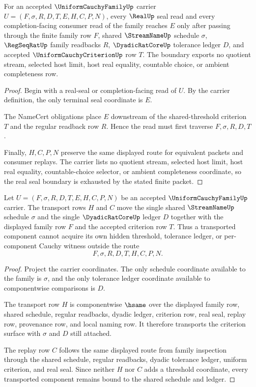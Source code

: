 \begin{theorem}
\label{thm:uniform-cauchy-family-real-seal-boundary}
For an accepted $\UniformCauchyFamilyUp$ carrier $U=(F,\sigma,R,D,T,E,H,C,P,N)$, every $\RealUp$ seal read and every completion-facing consumer read of the family reaches $E$ only after passing through the finite family row $F$, shared $\StreamNameUp$ schedule $\sigma$, $\RegSeqRatUp$ family readbacks $R$, $\DyadicRatCoreUp$ tolerance ledger $D$, and accepted $\UniformCauchyCriterionUp$ row $T$. The boundary exports no quotient stream, selected host limit, host real equality, countable choice, or ambient completeness row.
\end{theorem}
\begin{proof}
Begin with a real-seal or completion-facing read of $U$. By the carrier definition, the only terminal seal coordinate is $E$.

The NameCert obligations place $E$ downstream of the shared-threshold criterion $T$ and the regular readback row $R$. Hence the read must first traverse $F,\sigma,R,D,T$.

Finally, $H,C,P,N$ preserve the same displayed route for equivalent packets and consumer replays. The carrier lists no quotient stream, selected host limit, host real equality, countable-choice selector, or ambient completeness coordinate, so the real seal boundary is exhausted by the stated finite packet.
\end{proof}

\begin{theorem}
\label{thm:uniform-cauchy-family-shared-threshold-transport}
Let $U=(F,\sigma,R,D,T,E,H,C,P,N)$ be an accepted $\UniformCauchyFamilyUp$ carrier. The transport rows $H$ and $C$ move the single shared $\StreamNameUp$ schedule $\sigma$ and the single $\DyadicRatCoreUp$ ledger $D$ together with the displayed family row $F$ and the accepted criterion row $T$. Thus a transported component cannot acquire its own hidden threshold, tolerance ledger, or per-component Cauchy witness outside the route
$$
F,\sigma,R,D,T,H,C,P,N.
$$
\end{theorem}
\begin{proof}
Project the carrier coordinates. The only schedule coordinate available to the family is $\sigma$, and the only tolerance ledger coordinate available to componentwise comparisons is $D$.

The transport row $H$ is componentwise $\hsame$ over the displayed family row, shared schedule, regular readbacks, dyadic ledger, criterion row, real seal, replay row, provenance row, and local naming row. It therefore transports the criterion surface with $\sigma$ and $D$ still attached.

The replay row $C$ follows the same displayed route from family inspection through the shared schedule, regular readbacks, dyadic tolerance ledger, uniform criterion, and real seal. Since neither $H$ nor $C$ adds a threshold coordinate, every transported component remains bound to the shared schedule and ledger.
\end{proof}

